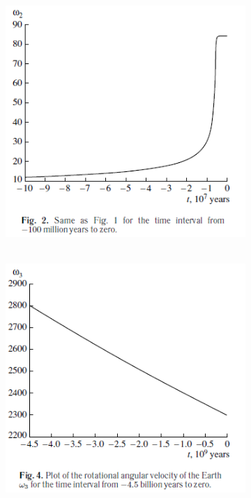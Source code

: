 \documentclass[fontsize = 11pt,a4paper]{article}
\begin{document}
\begin{figure}[h!]
\begin{subfigure}[t]{0.4\linewidth}
  \end{subfigure}
  \begin{subfigure}[b]{0.4\linewidth}
    \includegraphics[width=\linewidth]{graph2.png}
  \end{subfigure}
 \begin{subfigure}[b]{0.4\linewidth}
\hbox{\hspace{+9em}
    \includegraphics[width=\linewidth]{graph4.png}
}
  \end{subfigure}
\end{figure}
\end{document}
